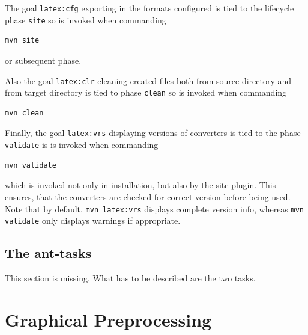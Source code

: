 \documentclass[12pt]{book}
\begin{document}
The goal \texttt{latex:cfg} exporting in the formats configured
is tied to the lifecycle phase \texttt{site} so is invoked
when commanding
%
\begin{Verbatim}[fontsize=\scriptsize]
mvn site
\end{Verbatim}
%
or subsequent phase.

Also the goal \texttt{latex:clr} cleaning created files
both from source directory and from target directory
is tied to phase \texttt{clean} so is invoked
when commanding
%
\begin{Verbatim}[fontsize=\scriptsize]
mvn clean
\end{Verbatim}

Finally, the goal \texttt{latex:vrs} displaying versions of converters
is tied to the phase \texttt{validate} is is invoked when commanding
%
\begin{Verbatim}[fontsize=\scriptsize]
mvn validate
\end{Verbatim}
%
which is invoked not only in installation, but also by the site plugin.
This ensures, that the converters are checked for correct version
before being used.
Note that by default, \texttt{mvn latex:vrs} displays complete version info,
whereas \texttt{mvn validate} only displays warnings if appropriate. 


\section{The ant-tasks}\label{sec:usageAntTask}

This section is missing.
What has to be described are the two tasks. 


\chapter{Graphical Preprocessing}\label{chap:GraphConversions}
\end{document}
